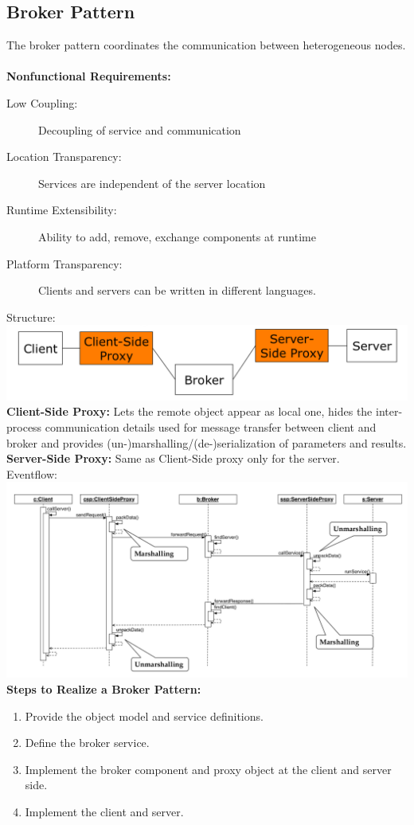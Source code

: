 \subsection{Broker Pattern}
The broker pattern coordinates the communication between heterogeneous nodes.\\
\\
\textbf{Nonfunctional Requirements:}\\
\vspace{-1.5em}
\begin{description}
  \item[Low Coupling:] Decoupling of service and communication
  \item[Location Transparency:] Services are independent of the server location
  \item[Runtime Extensibility:] Ability to add, remove, exchange components at runtime
  \item[Platform Transparency:] Clients and servers can be written in different languages.
\end{description}
Structure:\\
\includegraphics[width=\linewidth]{images/pattern_broker.png}
\textbf{Client-Side Proxy:} Lets the remote object appear as local one, hides the inter-process communication details used for message transfer between client and broker and provides (un-)marshalling/(de-)serialization of parameters and results.\\
\textbf{Server-Side Proxy:} Same as Client-Side proxy only for the server.\\
Eventflow:\\
\includegraphics[width=\linewidth]{images/eventflow_broker.png}
\textbf{Steps to Realize a Broker Pattern:}
\begin{enumerate}
  \item Provide the object model and service definitions.
  \item Define the broker service.
  \item Implement the broker component and proxy object at the client and server side.
  \item Implement the client and server.
\end{enumerate}


\newpage
